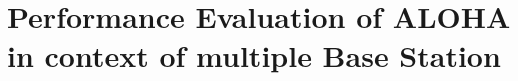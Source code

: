 \chapter{Performance Evaluation of ALOHA in context of multiple Base Station}

\ifpdf
    \graphicspath{{Chapter3/Figs/Raster/}{Chapter3/Figures/PDF/}{Chapter3/Figures/}}
\else
    \graphicspath{{Chapter3/Figs/Vector/}{Chapter3/Figures/}}
\fi












